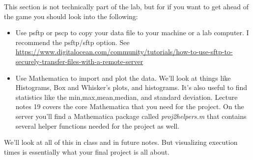 \documentclass[]{tufte-handout}
\begin{document}
This section is not technically part of the lab, but for if you want to get ahead of the game you should look into the following:
\begin{itemize}
\item Use psftp or pscp to copy your data file to your machine or a lab computer. I recommend the psftp/sftp option. 
\newline
See \url{https://www.digitalocean.com/community/tutorials/how-to-use-sftp-to-securely-transfer-files-with-a-remote-server}
\item Use Mathematica to import and plot the data.  We'll look at things like Histograms, Box and Whisker's plots, and histograms. It's also useful to find statistics like the min,max,mean,median, and standard deviation.   Lecture notes 19 covers the core Mathematica that you need for the project. On the server you'll find a Mathematica package called \textit{proj2helpers.m} that contains several helper functions needed for the project as well. 
\end{itemize}
We'll look at all of this in class and in future notes. But visualizing execution times is essentially what your final project is all about. 
\end{document}
